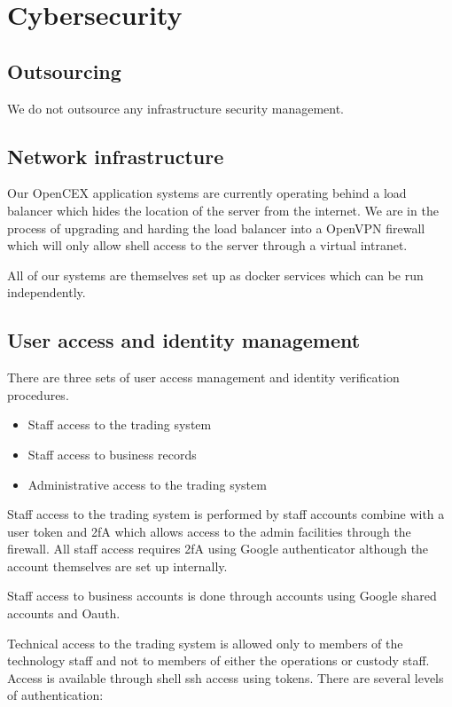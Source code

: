 \section{Cybersecurity}
\subsection{Outsourcing}
We do not outsource any infrastructure security management.

\subsection{Network infrastructure}
Our OpenCEX application systems are currently operating behind a load balancer
which hides the location of the server from the internet.  We are in
the process of upgrading and harding the load balancer into a OpenVPN
firewall which will only allow shell access to the server through a
virtual intranet.

All of our systems are themselves set up as docker services which can
be run independently.

\subsection{User access and identity management}

There are three sets of user access management and identity
verification procedures.
\begin{itemize}
\item Staff access to the trading system
\item Staff access to business records
\item Administrative access to the trading system
\end{itemize}

Staff access to the trading system is performed by staff accounts
combine with a user token and 2fA which allows access to the admin
facilities through the firewall.  All staff access requires 2fA using
Google authenticator although the account themselves are set up
internally.

Staff access to business accounts is done through accounts using
Google shared accounts and Oauth.

Technical access to the trading system is allowed only to members of
the technology staff and not to members of either the operations or
custody staff.  Access is available through shell ssh access using
tokens.  There are several levels of authentication:

